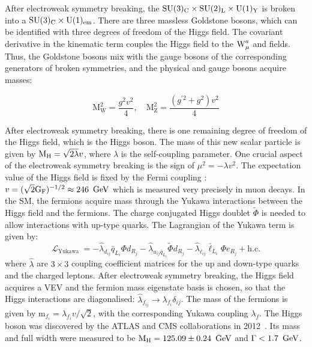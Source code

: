 After electroweak symmetry breaking, the $\text{SU}(3)_{\text{C}} \times \text{SU}(2)_{\text{L}} \times \text{U}(1)_{\text{Y}}$ is broken into a $\text{SU}(3)_{\text{C}} \times \text{U}(1)_{\text{em}}$. There are three massless Goldstone bosons, which can be identified with three degrees of freedom of the Higgs field. The covariant derivative in the kinematic term couples the Higgs field to the $\text{W}_{\mu}^{a}$ and \bmu fields. Thus, the Goldstone bosons mix with the gauge bosons of the corresponding generators of broken symmetries, and the physical \PW and \PZ gauge bosons acquire masses:

\begin{equation}
  \text{M}_{\text{W}}^2=\frac{g^2 v^2}{4}, \quad \text{M}_{\text{Z}}^2=\frac{(g^{\prime 2}+g^2) v^2}{4}
\end{equation}

After electroweak symmetry breaking, there is one remaining degree of freedom of the Higgs field, which is the Higgs boson. The mass of this new scalar particle is given by $\text{M}_{\text{H}} = \sqrt{2 \lambda} v$, where $\lambda$ is the self-coupling parameter. One crucial aspect of the electroweak symmetry breaking is the sign of $\mu^2=-\lambda v^2$. The expectation value of the Higgs field is fixed by the Fermi coupling \gf: $v=(\sqrt{2} \text{G}_{\text{F}})^{-1 / 2} \approx 246~\,\text{Ge\hspace{-.08em}V}$ which is measured very precisely in muon decays. In the SM, the fermions acquire mass through the Yukawa interactions between the Higgs field and the fermions. The charge conjugated Higgs doublet $\tilde{\Phi}$ is needed to allow interactions with up-type quarks. The Lagrangian of the Yukawa term is given by:
%
\begin{equation}
  \mathcal{L}_{\text {Yukawa }}=-\hat{\lambda}_{d_{i j}} \bar{q}_{L_{i}} \Phi d_{R_{j}}-\hat{\lambda}_{u_{i j} \bar{q}_{L_{i}}} \tilde{\Phi} d_{R_{j}}-\hat{\lambda}_{\ell_{i j}} \bar{\ell}_{L_{i}} \Phi e_{R_{j}}+\text {h.c.}
\end{equation}
%
where $\hat{\lambda}$ are $3 \times 3$ coupling coefficient matrices for the up and down-type quarks and the charged leptons. After electroweak symmetry breaking, the Higgs field acquires a VEV and the fermion mass eigenstate basis is chosen, so that the Higgs interactions are diagonalised: $\hat{\lambda}_{f_{i j}} \to \lambda_{f_{i}} \delta_{i j}$. The mass of the fermions is given by $\text{m}_{f_{i}} = \lambda_{f_{i}} v / \sqrt{2}$, with the corresponding Yukawa coupling $\lambda_{f}$. The Higgs boson was discovered by the ATLAS and CMS collaborations in 2012~\cite{Chatrchyan:2013lba}. Its mass and full width were measured to be $\text{M}_{\text{H}} = 125.09 \pm 0.24~\,\text{Ge\hspace{-.08em}V}$ and $\Gamma < 1.7~\,\text{Ge\hspace{-.08em}V}$.


